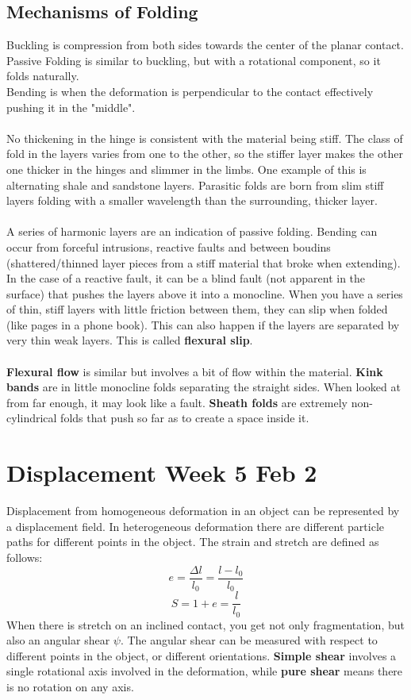 \documentclass[12pt,a4paper]{report}
\begin{document}
\subsection*{Mechanisms of Folding}
Buckling is compression from both sides towards the center of the planar contact.\\
Passive Folding is similar to buckling, but with a rotational component, so it folds naturally.\\
Bending is when the deformation is perpendicular to the contact effectively pushing it in the "middle".\\
\\
No thickening in the hinge is consistent with the material being stiff.
The class of fold in the layers varies from one to the other, so the stiffer layer makes the other one thicker in the hinges and slimmer in the limbs.
One example of this is alternating shale and sandstone layers.
Parasitic folds are born from slim stiff layers folding with a smaller wavelength than the surrounding, thicker layer.\\
\\
A series of harmonic layers are an indication of passive folding.
Bending can occur from forceful intrusions, reactive faults and between boudins (shattered/thinned layer pieces from a stiff material that broke when extending). In the case of a reactive fault, it can be a blind fault (not apparent in the surface) that pushes the layers above it into a monocline.
When you have a series of thin, stiff layers with little friction between them, they can slip when folded (like pages in a phone book).
This can also happen if the layers are separated by very thin weak layers. This is called \textbf{flexural slip}.\\
\\
\textbf{Flexural flow} is similar but involves a bit of flow within the material.
\textbf{Kink bands} are in little monocline folds separating the straight sides.
When looked at from far enough, it may look like a fault.
\textbf{Sheath folds} are extremely non-cylindrical folds that push so far as to create a space inside it.

\section*{Displacement Week 5 Feb 2}
Displacement from homogeneous deformation in an object can be represented by a displacement field.
In heterogeneous deformation there are different particle paths for different points in the object.
The strain and stretch are defined as follows:
$$ e = \frac{\Delta l}{l_0} = \frac{l - l_0}{l_0} $$
$$ S = 1 + e = \frac{l}{l_0} $$
When there is stretch on an inclined contact, you get not only fragmentation, but also an angular shear $\psi$.
The angular shear can be measured with respect to different points in the object, or different orientations.
\textbf{Simple shear} involves a single rotational axis involved in the deformation, while \textbf{pure shear} means there is no rotation on any axis.
\end{document}
